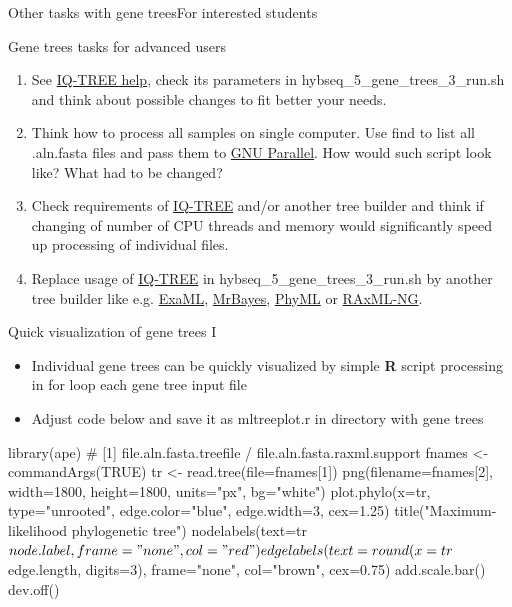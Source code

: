 \documentclass[compress,  xelatex, 11pt, xcolor=x11names, aspectratio=169,
	hyperref={
		bookmarks=true,
		unicode=true,
		colorlinks=true,
		pdftitle={HybSeq course},
		plainpages=false,
		pdfauthor={Vojtech Zeisek},
		pdfsubject={Practical processing of HybSeq target enrichment sequencing data on computing grids like MetaCentrum},
		pdfcreator={XeLaTeX},
		pdfkeywords={BASH, command line, GNU, HybSeq, Linux, MetaCentrum, sequencing shell, target enrichment},
		linkcolor=Turquoise4, %
		anchorcolor=DodgerBlue4, %
		citecolor=DodgerBlue4, %
		filecolor=DodgerBlue4, %
		menucolor=Tan4, %
		urlcolor=DarkOliveGreen4 %
		},
	url={hyphens, lowtilde} %
	]{beamer}
\renewcommand{\texttt}[1]{\colorbox{Cornsilk2}{{\ttfamily #1}}}
\begin{document}
\begin{frame}{Other tasks with gene trees}{For interested students}
	\begin{exampleblock}{Gene trees tasks for advanced users}
		\begin{enumerate}
			\item See \href{http://www.iqtree.org/doc/Command-Reference}{IQ-TREE help}, check its parameters in \texttt{hybseq\_5\_gene\_trees\_3\_run.sh} and think about possible changes to fit better your needs.
			\item Think how to process all samples on single computer. Use \texttt{find} to list all \texttt{*.aln.fasta} files and pass them to \href{https://www.gnu.org/software/parallel/}{GNU Parallel}. How would such script look like? What had to be changed?
			\item Check requirements of \href{http://www.iqtree.org/}{IQ-TREE} and/or another tree builder and think if changing of number of CPU threads and memory would significantly speed up processing of individual files.
			\item Replace usage of \href{http://www.iqtree.org/}{IQ-TREE} in \texttt{hybseq\_5\_gene\_trees\_3\_run.sh} by another tree builder like e.g. \href{https://github.com/stamatak/ExaML}{ExaML}, \href{https://nbisweden.github.io/MrBayes/}{MrBayes}, \href{https://github.com/stephaneguindon/phyml}{PhyML} or \href{https://github.com/amkozlov/raxml-ng}{RAxML-NG}.
		\end{enumerate}
	\end{exampleblock}
\end{frame}

\begin{frame}[fragile]{Quick visualization of gene trees I}
	\begin{itemize}
		\item Individual gene trees can be quickly visualized by simple \textbf{R} script processing in \texttt{for} loop each gene tree input file
		\item Adjust code below and save it as \texttt{mltreeplot.r} in directory  with gene trees
	\end{itemize}
	\begin{spluscode}
    library(ape)
    # [1] file.aln.fasta.treefile / file.aln.fasta.raxml.support
    fnames <- commandArgs(TRUE)
    tr <- read.tree(file=fnames[1])
    png(filename=fnames[2], width=1800, height=1800, units="px", bg="white")
      plot.phylo(x=tr, type="unrooted", edge.color="blue", edge.width=3,
        cex=1.25)
      title("Maximum-likelihood phylogenetic tree")
      nodelabels(text=tr$node.label, frame="none", col="red")
      edgelabels(text=round(x=tr$edge.length, digits=3), frame="none",
        col="brown", cex=0.75)
      add.scale.bar()
      dev.off()
	\end{spluscode}
\end{frame}
\end{document}
